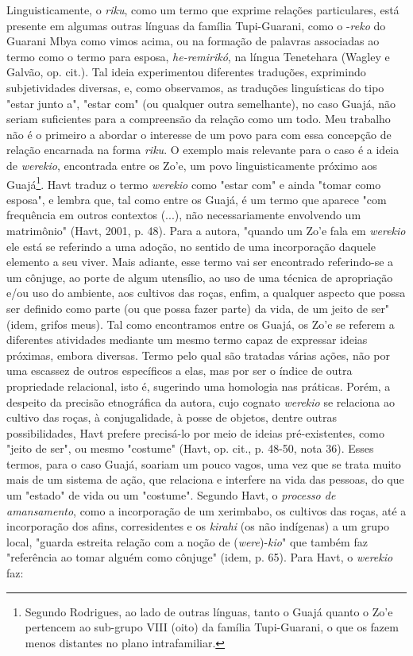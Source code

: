 Linguisticamente, o \emph{riku}, como um termo que exprime relações
particulares, está presente em algumas outras línguas da família
Tupi-Guarani, como o -\emph{reko} do Guarani Mbya como vimos acima, ou
na formação de palavras associadas ao termo como o termo para esposa,
\emph{he-remirikó}, na língua Tenetehara (Wagley e Galvão, op. cit.).
Tal ideia experimentou diferentes traduções, exprimindo subjetividades
diversas, e, como observamos, as traduções linguísticas do tipo "estar
junto a", "estar com" (ou qualquer outra semelhante), no caso Guajá, não
seriam suficientes para a compreensão da relação como um todo. Meu
trabalho não é o primeiro a abordar o interesse de um povo para com essa
concepção de relação encarnada na forma \emph{riku}. O exemplo mais
relevante para o caso é a ideia de \emph{werekio}, encontrada entre os
Zo'e, um povo linguisticamente próximo aos Guajá\footnote{Segundo
  Rodrigues, ao lado de outras línguas, tanto o Guajá quanto o Zo'e
  pertencem ao sub-grupo VIII (oito) da família Tupi-Guarani, o que os
  fazem menos distantes no plano intrafamiliar.}. Havt traduz o termo
\emph{werekio} como "estar com" e ainda "tomar como esposa", e lembra
que, tal como entre os Guajá, é um termo que aparece "com frequência em
outros contextos (...), não necessariamente envolvendo um matrimônio"
(Havt, 2001, p. 48). Para a autora, "quando um Zo'e fala em
\emph{werekio} ele está se referindo a uma adoção, no sentido de uma
incorporação daquele elemento a seu viver. Mais adiante, esse termo vai
ser encontrado referindo-se a um cônjuge, ao porte de algum utensílio,
ao uso de uma técnica de apropriação e/ou uso do ambiente, aos cultivos
das roças, enfim, a qualquer aspecto que possa ser definido como parte
(ou que possa fazer parte) da vida, de um jeito de ser" (idem, grifos
meus). Tal como encontramos entre os Guajá, os Zo'e se referem a
diferentes atividades mediante um mesmo termo capaz de expressar ideias
próximas, embora diversas. Termo pelo qual são tratadas várias ações,
não por uma escassez de outros específicos a elas, mas por ser o índice
de outra propriedade relacional, isto é, sugerindo uma homologia nas
práticas. Porém, a despeito da precisão etnográfica da autora, cujo
cognato \emph{werekio} se relaciona ao cultivo das roças, à
conjugalidade, à posse de objetos, dentre outras possibilidades, Havt
prefere precisá-lo por meio de ideias pré-existentes, como "jeito de
ser", ou mesmo "costume" (Havt, op. cit., p. 48-50, nota 36). Esses
termos, para o caso Guajá, soariam um pouco vagos, uma vez que se trata
muito mais de um sistema de ação, que relaciona e interfere na vida das
pessoas, do que um "estado" de vida ou um "costume". Segundo Havt, o
\emph{processo de amansamento}, como a incorporação de um xerimbabo, os
cultivos das roças, até a incorporação dos afins, corresidentes e os
\emph{kirahi} (os não indígenas) a um grupo local, "guarda estreita
relação com a noção de (\emph{were})-\emph{kio}" que também faz
"referência ao tomar alguém como cônjuge" (idem, p. 65). Para Havt, o
\emph{werekio} faz:

